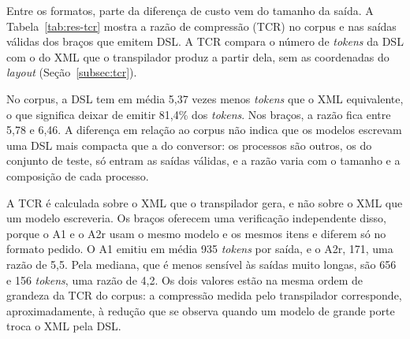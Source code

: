 Entre os formatos, parte da diferença de custo vem do tamanho da saída. A Tabela~\ref{tab:res-tcr} mostra a razão de compressão (TCR) no corpus e nas saídas válidas dos braços que emitem DSL. A TCR compara o número de \textit{tokens} da DSL com o do XML que o transpilador produz a partir dela, sem as coordenadas do \textit{layout} (Seção~\ref{subsec:tcr}).

\begin{table}[htb]
\end{table}

No corpus, a DSL tem em média 5,37 vezes menos \textit{tokens} que o XML equivalente, o que significa deixar de emitir 81,4\% dos \textit{tokens}. Nos braços, a razão fica entre 5,78 e 6,46. A diferença em relação ao corpus não indica que os modelos escrevam uma DSL mais compacta que a do conversor: os processos são outros, os do conjunto de teste, só entram as saídas válidas, e a razão varia com o tamanho e a composição de cada processo.

A TCR é calculada sobre o XML que o transpilador gera, e não sobre o XML que um modelo escreveria. Os braços oferecem uma verificação independente disso, porque o A1 e o A2r usam o mesmo modelo e os mesmos itens e diferem só no formato pedido. O A1 emitiu em média 935 \textit{tokens} por saída, e o A2r, 171, uma razão de 5,5. Pela mediana, que é menos sensível às saídas muito longas, são 656 e 156 \textit{tokens}, uma razão de 4,2. Os dois valores estão na mesma ordem de grandeza da TCR do corpus: a compressão medida pelo transpilador corresponde, aproximadamente, à redução que se observa quando um modelo de grande porte troca o XML pela DSL.


